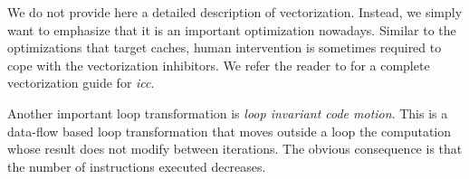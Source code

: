 We do not provide here a detailed description of vectorization. Instead, we
simply want to emphasize that it is an important optimization nowadays. Similar
to the optimizations that target caches, human intervention is sometimes
required to cope with the vectorization inhibitors. We refer the reader to
\cite{vec_guide} for a complete vectorization guide for \textit{icc}.

Another important loop transformation is \textit{loop invariant code motion}.
This is a data-flow based loop transformation that moves outside a loop the computation
whose result does not modify between iterations. The obvious consequence is that
the number of instructions executed decreases.

% 

